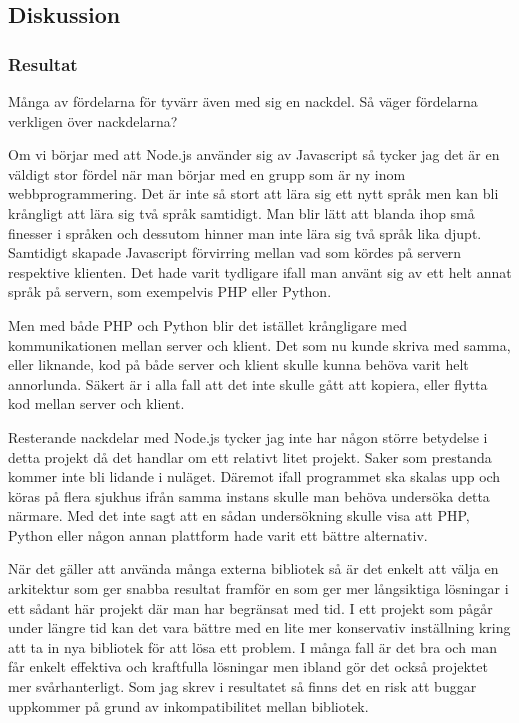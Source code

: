 \subsection{Diskussion}

\subsubsection{Resultat}

Många av fördelarna för tyvärr även med sig en nackdel. Så väger fördelarna verkligen över nackdelarna? 

Om vi börjar med att Node.js använder sig av Javascript så tycker jag det är en väldigt stor fördel när man börjar med en grupp som är ny inom webbprogrammering. Det är inte så stort att lära sig ett nytt språk men kan bli krångligt att lära sig två språk samtidigt. Man blir lätt att blanda ihop små finesser i språken och dessutom hinner man inte lära sig två språk lika djupt. Samtidigt skapade Javascript förvirring mellan vad som kördes på servern respektive klienten. Det hade varit tydligare ifall man använt sig av ett helt annat språk på servern, som exempelvis PHP eller Python.

Men med både PHP och Python blir det istället krångligare med kommunikationen mellan server och klient. Det som nu kunde skriva med samma, eller liknande, kod på både server och klient skulle kunna behöva varit helt annorlunda. Säkert är i alla fall att det inte skulle gått att kopiera, eller flytta kod mellan server och klient.

Resterande nackdelar med Node.js tycker jag inte har någon större betydelse i detta projekt då det handlar om ett relativt litet projekt. Saker som prestanda kommer inte bli lidande i nuläget. Däremot ifall programmet ska skalas upp och köras på flera sjukhus ifrån samma instans skulle man behöva undersöka detta närmare. Med det inte sagt att en sådan undersökning skulle visa att PHP, Python eller någon annan plattform hade varit ett bättre alternativ.

När det gäller att använda många externa bibliotek så är det enkelt att välja en arkitektur som ger snabba resultat framför en som ger mer långsiktiga lösningar i ett sådant här projekt där man har begränsat med tid. I ett projekt som pågår under längre tid kan det vara bättre med en lite mer konservativ inställning kring att ta in nya bibliotek för att lösa ett problem. I många fall är det bra och man får enkelt effektiva och kraftfulla lösningar men ibland gör det också projektet mer svårhanterligt. Som jag skrev i resultatet så finns det en risk att buggar uppkommer på grund av inkompatibilitet mellan bibliotek. 

